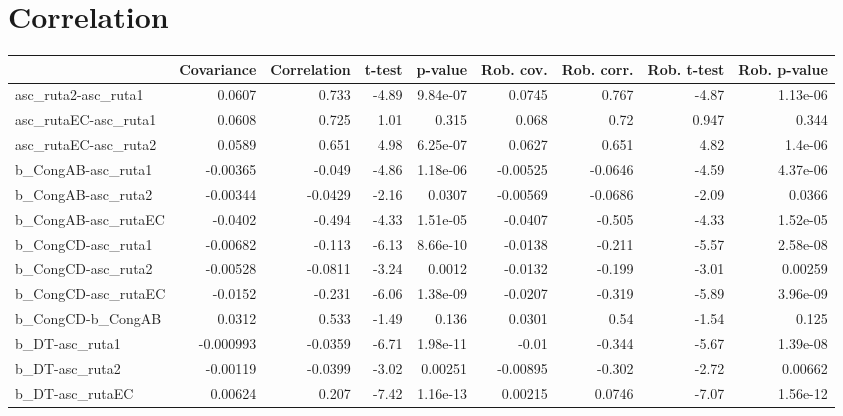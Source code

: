 \section{Correlation}
\begin{tabular}{lrrrrrrrr}
\toprule
{} &  Covariance &  Correlation &  t-test &  p-value &  Rob. cov. &  Rob. corr. &  Rob. t-test &  Rob. p-value \\
\midrule
asc\_ruta2-asc\_ruta1  &      0.0607 &        0.733 &   -4.89 & 9.84e-07 &     0.0745 &       0.767 &        -4.87 &      1.13e-06 \\
asc\_rutaEC-asc\_ruta1 &      0.0608 &        0.725 &    1.01 &    0.315 &      0.068 &        0.72 &        0.947 &         0.344 \\
asc\_rutaEC-asc\_ruta2 &      0.0589 &        0.651 &    4.98 & 6.25e-07 &     0.0627 &       0.651 &         4.82 &       1.4e-06 \\
b\_CongAB-asc\_ruta1   &    -0.00365 &       -0.049 &   -4.86 & 1.18e-06 &   -0.00525 &     -0.0646 &        -4.59 &      4.37e-06 \\
b\_CongAB-asc\_ruta2   &    -0.00344 &      -0.0429 &   -2.16 &   0.0307 &   -0.00569 &     -0.0686 &        -2.09 &        0.0366 \\
b\_CongAB-asc\_rutaEC  &     -0.0402 &       -0.494 &   -4.33 & 1.51e-05 &    -0.0407 &      -0.505 &        -4.33 &      1.52e-05 \\
b\_CongCD-asc\_ruta1   &    -0.00682 &       -0.113 &   -6.13 & 8.66e-10 &    -0.0138 &      -0.211 &        -5.57 &      2.58e-08 \\
b\_CongCD-asc\_ruta2   &    -0.00528 &      -0.0811 &   -3.24 &   0.0012 &    -0.0132 &      -0.199 &        -3.01 &       0.00259 \\
b\_CongCD-asc\_rutaEC  &     -0.0152 &       -0.231 &   -6.06 & 1.38e-09 &    -0.0207 &      -0.319 &        -5.89 &      3.96e-09 \\
b\_CongCD-b\_CongAB    &      0.0312 &        0.533 &   -1.49 &    0.136 &     0.0301 &        0.54 &        -1.54 &         0.125 \\
b\_DT-asc\_ruta1       &   -0.000993 &      -0.0359 &   -6.71 & 1.98e-11 &      -0.01 &      -0.344 &        -5.67 &      1.39e-08 \\
b\_DT-asc\_ruta2       &    -0.00119 &      -0.0399 &   -3.02 &  0.00251 &   -0.00895 &      -0.302 &        -2.72 &       0.00662 \\
b\_DT-asc\_rutaEC      &     0.00624 &        0.207 &   -7.42 & 1.16e-13 &    0.00215 &      0.0746 &        -7.07 &      1.56e-12 \\

\end{tabular}
